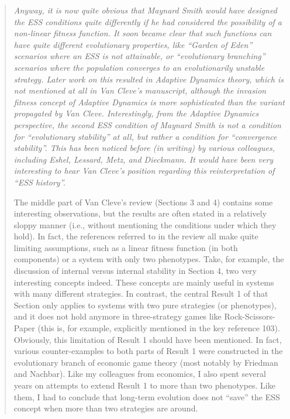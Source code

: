 \documentclass[10pt,parskip=full,foldmarks=off,addrfield=off,backaddress=false,refline=dateleft,letterpaper]{scrlttr2}
\newenvironment{reviewerquote}{\begin{quote}\color{DarkBlue}\itshape}{\end{quote}}
\begin{document}
\begin{letter}
\begin{reviewerquote}
Anyway, it is now quite obvious that Maynard Smith would have designed the ESS conditions quite differently if he had considered the possibility of a non-linear fitness function. It soon became clear that such functions can have quite different evolutionary properties, like “Garden of Eden” scenarios where an ESS is not attainable, or “evolutionary branching” scenarios where the population converges to an evolutionarily unstable strategy. Later work on this resulted in Adaptive Dynamics theory, which is not mentioned at all in Van Cleve’s manuscript, although the invasion fitness concept of Adaptive Dynamics is more sophisticated than the variant propagated by Van Cleve. Interestingly, from the Adaptive Dynamics perspective, the second ESS condition of Maynard Smith is not a condition for “evolutionary stability” at all, but rather a condition for “convergence stability”. This has been noticed before (in writing) by various colleagues, including Eshel, Lessard, Metz, and Dieckmann. It would have been very interesting to hear Van Cleve’s position regarding this reinterpretation of “ESS history”.

The middle part of Van Cleve’s review (Sections 3 and 4) contains some interesting observations, but the results are often stated in a relatively sloppy manner (i.e., without mentioning the conditions under which they hold). In fact, the references referred to in the review all make quite limiting assumptions, such as a linear fitness function (in both components) or a system with only two phenotypes. Take, for example, the discussion of internal versus internal stability in Section 4, two very interesting concepts indeed. These concepts are mainly useful in systems with many different strategies. In contrast, the central Result 1 of that Section only applies to systems with two pure strategies (or phenotypes), and it does not hold anymore in three-strategy games like Rock-Scissors-Paper (this is, for example, explicitly mentioned in the key reference 103). Obviously, this limitation of Result 1 should have been mentioned. In fact, various counter-examples to both parts of Result 1 were constructed in the evolutionary branch of economic game theory (most notably by Friedman and Nachbar). Like my colleagues from economics, I also spent several years on attempts to extend Result 1 to more than two phenotypes. Like them, I had to conclude that long-term evolution does not “save” the ESS concept when more than two strategies are around.


\end{reviewerquote}
\end{letter}
\end{document}
